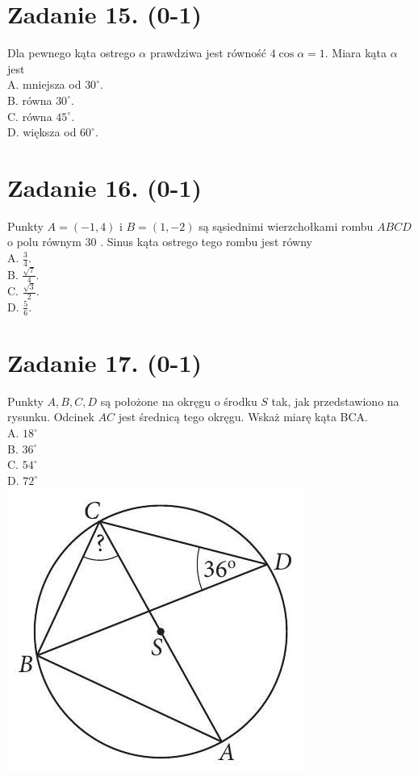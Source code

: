 \documentclass[10pt]{article}
\begin{document}
\section*{Zadanie 15. (0-1)}
Dla pewnego kąta ostrego \(\alpha\) prawdziwa jest równość \(4 \cos \alpha=1\). Miara kąta \(\alpha\) jest\\
A. mniejsza od \(30^{\circ}\).\\
B. równa \(30^{\circ}\).\\
C. równa \(45^{\circ}\).\\
D. większa od \(60^{\circ}\).

\section*{Zadanie 16. (0-1)}
Punkty \(A=(-1,4)\) i \(B=(1,-2)\) są sąsiednimi wierzchołkami rombu \(A B C D\) o polu równym 30 . Sinus kąta ostrego tego rombu jest równy\\
A. \(\frac{3}{4}\).\\
B. \(\frac{\sqrt{7}}{4}\).\\
C. \(\frac{\sqrt{3}}{2}\).\\
D. \(\frac{5}{6}\).

\section*{Zadanie 17. (0-1)}
Punkty \(A, B, C, D\) są położone na okręgu o środku \(S\) tak, jak przedstawiono na rysunku. Odcinek \(A C\) jest średnicą tego okręgu. Wskaż miarę kąta BCA.\\
A. \(18^{\circ}\)\\
B. \(36^{\circ}\)\\
C. \(54^{\circ}\)\\
D. \(72^{\circ}\)\\
\includegraphics[max width=\textwidth, center]{2024_11_21_1e89351873aa60c4c1b9g-06}
\end{document}
